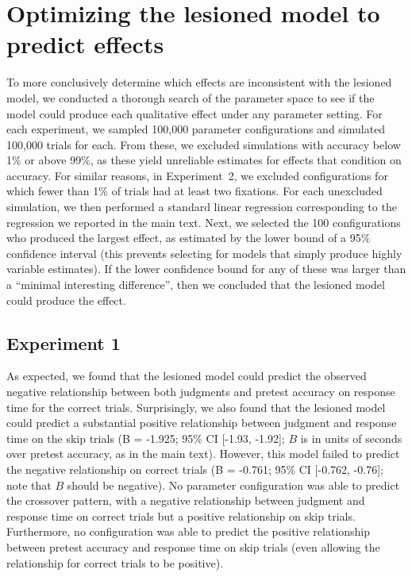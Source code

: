\section{Optimizing the lesioned model to predict effects}\label{app:lesion-search}

To more conclusively determine which effects are inconsistent with the lesioned model, we conducted a thorough search of the parameter space to see if the model could produce each qualitative effect under any parameter setting. For each experiment, we sampled 100,000 parameter configurations and simulated 100,000 trials for each. From these, we excluded simulations with accuracy below 1\% or above 99\%, as these yield unreliable estimates for effects that condition on accuracy. For similar reasons, in Experiment~2, we excluded configurations for which fewer than 1\% of trials had at least two fixations. For each unexcluded simulation, we then performed a standard linear regression corresponding to the regression we reported in the main text. Next, we selected the 100 configurations who produced the largest effect, as estimated by the lower bound of a 95\% confidence interval (this prevents selecting for models that simply produce highly variable estimates). If the lower confidence bound for any of these was larger than a ``minimal interesting difference'', then we concluded that the lesioned model could produce the effect.

\subsection{Experiment 1}

As expected, we found that the lesioned model could predict the observed negative relationship between both judgments and pretest accuracy on response time for the correct trials. Surprisingly, we also found that the lesioned model could predict a substantial positive relationship between judgment and response time on the skip trials (B = -1.925; 95\% CI [-1.93, -1.92]; $B$ is in units of seconds over pretest accuracy, as in the main text). However, this model failed to predict the negative relationship on correct trials (B = -0.761; 95\% CI [-0.762, -0.76]; note that $B$ should be negative). No parameter configuration was able to predict the crossover pattern, with a negative relationship between judgment and response time on correct trials but a positive relationship on skip trials. Furthermore, no configuration was able to predict the positive relationship between pretest accuracy and response time on skip trials (even allowing the relationship for correct trials to be positive).

